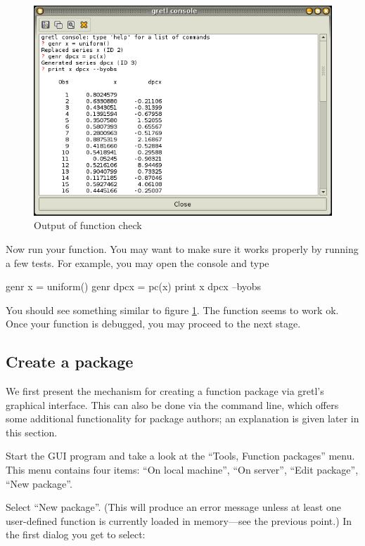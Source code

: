 \begin{figure}[htbp]
  \centering
  \includegraphics[scale=0.5]{figures/func_check}
  \caption{Output of function check}
  \label{fig:func_check}
\end{figure}

Now run your function. You may want to make sure it works properly by
running a few tests. For example, you may open the console and type

\begin{code}
genr x = uniform()
genr dpcx = pc(x)
print x dpcx --byobs
\end{code}

You should see something similar to figure \ref{fig:func_check}. The
function seems to work ok.  Once your function is debugged, you
may proceed to the next stage.

\subsection{Create a package}

We first present the mechanism for creating a function package via
gretl's graphical interface. This can also be done via the
command line, which offers some additional functionality for package
authors; an explanation is given later in this section.

Start the GUI program and take a look at the ``Tools, Function
packages'' menu.  This menu contains four items: ``On local machine'',
``On server'', ``Edit package'', ``New package''.

Select ``New package''.  (This will produce an error message unless at
least one user-defined function is currently loaded in memory---see
the previous point.)  In the first dialog you get to select:

